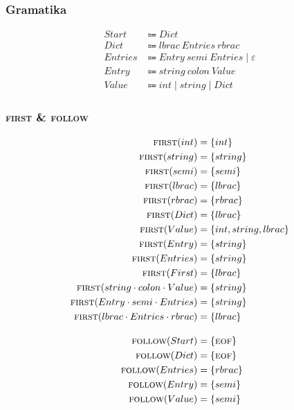\documentclass{report}
\newcommand{\Null}{\varepsilon}
\newcommand{\Seq}{\cdot}
\newcommand{\Spc}{\ }
\newcommand{\Union}{\mathrel{|}}
\newcommand{\FIRST}{\textsc{first}}
\newcommand{\FOLLOW}{\textsc{follow}}
\newcommand{\EOF}{\textsc{eof}}
\newcommand{\Arrow}{\Coloneq}
\newcommand{\NT}[1]{{#1}}
\newcommand{\T}[1]{{#1}}
\begin{document}
\subsubsection*{Gramatika}
\begin{equation*}
  \begin{aligned}
    \NT{Start} &\Arrow \NT{Dict}\\
    \NT{Dict} &\Arrow \T{lbrac} \Spc \NT{Entries} \Spc \T{rbrac}\\
    \NT{Entries} &\Arrow \NT{Entry} \Spc \T{semi} \Spc \NT{Entries} \Union \Null\\
    \NT{Entry} &\Arrow \T{string} \Spc \T{colon} \Spc \NT{Value}\\
    \NT{Value} &\Arrow \T{int} \Union \T{string} \Union \NT{Dict}
  \end{aligned}
\end{equation*}

\subsubsection*{{\FIRST} \& {\FOLLOW}}
\begin{equation*}
  \begin{aligned}
    \FIRST(\T{int}) &= \{\T{int}\}\\
    \FIRST(\T{string}) &= \{\T{string}\}\\
    \FIRST(\T{semi}) &= \{\T{semi}\}\\
    \FIRST(\T{lbrac}) &= \{\T{lbrac}\}\\
    \FIRST(\T{rbrac}) &= \{\T{rbrac}\}\\
    \FIRST(\NT{Dict}) &= \{\T{lbrac}\}\\
    \FIRST(\NT{Value}) &= \{\T{int}, \T{string}, \T{lbrac}\}\\
    \FIRST(\NT{Entry}) &= \{\T{string}\}\\
    \FIRST(\NT{Entries}) &= \{\T{string}\}\\
    \FIRST(\NT{First}) &= \{\T{lbrac}\}\\
    \FIRST(\T{string} \Seq \T{colon} \Seq \NT{Value}) &= \{\T{string}\}\\
    \FIRST(\NT{Entry} \Seq \T{semi} \Seq \NT{Entries}) &= \{\T{string}\}\\
    \FIRST(\T{lbrac} \Seq \NT{Entries} \Seq \T{rbrac}) &= \{\T{lbrac}\}\\[1em]
    \FOLLOW(\NT{Start}) &= \{\EOF\}\\
    \FOLLOW(\NT{Dict}) &= \{\EOF\}\\
    \FOLLOW(\NT{Entries}) &= \{\T{rbrac}\}\\
    \FOLLOW(\NT{Entry}) &= \{\T{semi}\}\\
    \FOLLOW(\NT{Value}) &= \{\T{semi}\}
  \end{aligned}
\end{equation*}
\end{document}
